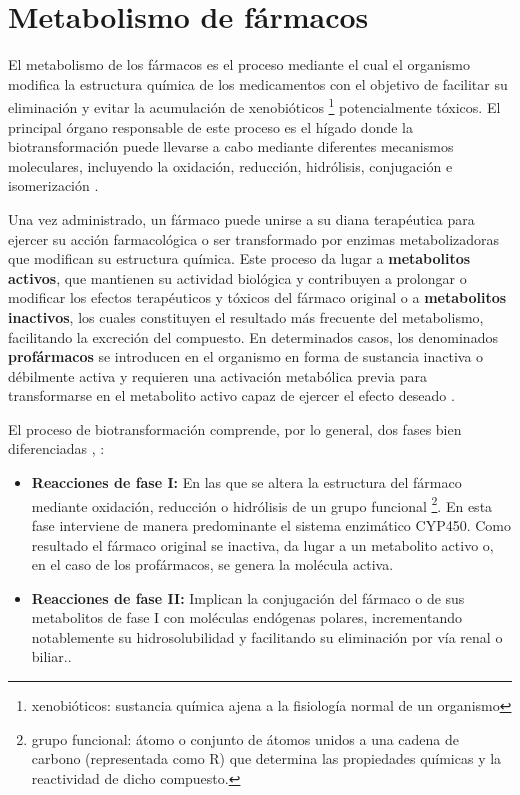 
\section{Metabolismo de fármacos}
El metabolismo de los fármacos es el proceso mediante el cual el organismo modifica la estructura química de los 
medicamentos con el objetivo de facilitar su eliminación y evitar la acumulación de xenobióticos \footnote{xenobióticos: sustancia química ajena a la fisiología normal de un organismo} potencialmente 
tóxicos. El principal órgano responsable de este proceso es el hígado donde la biotransformación puede llevarse a cabo mediante diferentes mecanismos moleculares, incluyendo la oxidación, reducción, hidrólisis, conjugación e isomerización \cite{msd_metabolismo}.

Una vez administrado, un fármaco puede unirse a su diana terapéutica para ejercer su acción farmacológica o ser 
transformado por enzimas metabolizadoras que modifican su estructura química. Este proceso da lugar a \textbf{metabolitos activos}, que mantienen su actividad biológica y contribuyen a prolongar o 
modificar los efectos terapéuticos y tóxicos del fármaco original o a \textbf{metabolitos inactivos}, los cuales constituyen el resultado más frecuente del metabolismo, facilitando la excreción del compuesto.
En determinados casos, los denominados \textbf{profármacos} se introducen en el organismo en forma de sustancia inactiva o débilmente activa y requieren una activación metabólica previa para transformarse en el metabolito activo capaz de ejercer el efecto deseado \cite{msd_metabolismo}.

El proceso de biotransformación comprende, por lo general, dos fases bien diferenciadas \cite{sefh_medicamentos}, \cite{guengerich2008cytochrome}: 
\begin{itemize}
    \item \textbf{Reacciones de fase I:} En las que se altera la estructura del fármaco mediante oxidación, reducción o hidrólisis de un grupo funcional \footnote{grupo funcional: átomo o conjunto de átomos unidos a una cadena de carbono (representada como R) que determina las propiedades químicas y la reactividad de dicho compuesto.}. En esta fase interviene de manera predominante el sistema enzimático CYP450. Como resultado el fármaco original se inactiva, da lugar a un metabolito activo o, en el caso de los profármacos, se genera la molécula activa.
    \item \textbf{Reacciones de fase II:} Implican la conjugación del fármaco o de sus metabolitos de fase I con moléculas endógenas polares, incrementando notablemente su hidrosolubilidad y facilitando su eliminación por vía renal o biliar..
\end{itemize}

